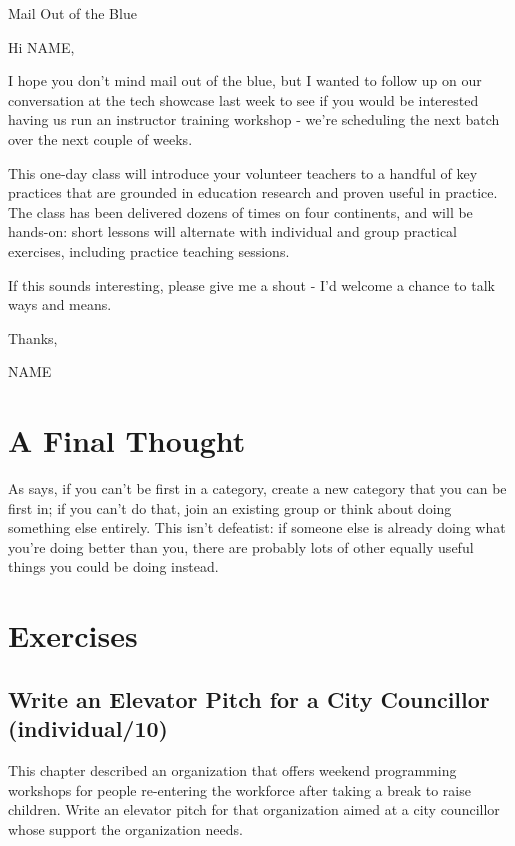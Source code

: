 \begin{aside}{Mail Out of the Blue}

Hi NAME,

I hope you don't mind mail out of the blue, but I wanted to follow up
on our conversation at the tech showcase last week to see if you would
be interested having us run an instructor training workshop - we're
scheduling the next batch over the next couple of weeks.

This one-day class will introduce your volunteer teachers to a handful
of key practices that are grounded in education research and proven
useful in practice. The class has been delivered dozens of times on
four continents, and will be hands-on: short lessons will alternate
with individual and group practical exercises, including practice
teaching sessions.

If this sounds interesting, please give me a shout - I'd welcome a
chance to talk ways and means.

Thanks,

NAME

\end{aside}

\section{A Final Thought}\label{s:marketing-final}

As \cite{Kuch2011} says, if you can't be first in a category, create
a new category that you can be first in; if you can't do that, join an
existing group or think about doing something else entirely. This isn't
defeatist: if someone else is already doing what you're doing better
than you, there are probably lots of other equally useful things you
could be doing instead.

\section{Exercises}\label{s:marketing-exercises}

\subsection*{Write an Elevator Pitch for a City Councillor (individual/10)}

This chapter described an organization that offers weekend programming
workshops for people re-entering the workforce after taking a break to
raise children. Write an elevator pitch for that organization aimed at a
city councillor whose support the organization needs.

